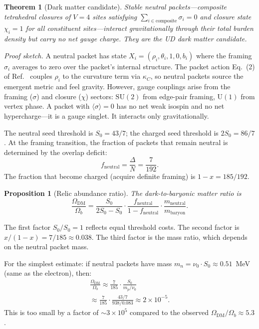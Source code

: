 \documentclass[11pt,twocolumn]{article}
\newtheorem{theorem}{Theorem}
\newtheorem{proposition}{Proposition}
\begin{document}
\begin{theorem}[Dark matter candidate]
\label{thm:dm}
Stable neutral packets---composite tetrahedral closures of $V=4$ sites satisfying $\sum_{i\in\mathrm{composite}}\sigma_i=0$ and closure state $\chi_i=1$ for all constituent sites---interact gravitationally through their total burden density but carry no net gauge charge.
They are the UD dark matter candidate.
\end{theorem}

\textit{Proof sketch.}
A neutral packet has state $X_i=(\rho_i,\theta_i,1,0,b_i)$ where the framing $\sigma_i$ averages to zero over the packet's internal structure.
The packet action Eq.~(2) of Ref.~\cite{mayes2026ud} couples $\rho_i$ to the curvature term via $\kappa_C$, so neutral packets source the emergent metric and feel gravity.
However, gauge couplings arise from the framing ($\sigma$) and closure ($\chi$) sectors: $\mathrm{SU}(2)$ from edge-pair framing, $\mathrm{U}(1)$ from vertex phase.
A packet with $\langle\sigma\rangle=0$ has no net weak isospin and no net hypercharge---it is a gauge singlet.
It interacts only gravitationally.

The neutral seed threshold is $S_0=43/7$; the charged seed threshold is $2S_0=86/7$.
At the framing transition, the fraction of packets that remain neutral is determined by the overlap deficit:
\begin{equation}
f_{\mathrm{neutral}} = \frac{\Delta}{N} = \frac{7}{192}.
\label{eq:fneutral}
\end{equation}
The fraction that become charged (acquire definite framing) is $1-x=185/192$.

\begin{proposition}[Relic abundance ratio]
The dark-to-baryonic matter ratio is
\begin{equation}
\frac{\Omega_{\mathrm{DM}}}{\Omega_b} = \frac{S_0}{2S_0-S_0}\cdot\frac{f_{\mathrm{neutral}}}{1-f_{\mathrm{neutral}}}\cdot\frac{m_{\mathrm{neutral}}}{m_{\mathrm{baryon}}}.
\label{eq:ratio}
\end{equation}
\end{proposition}

The first factor $S_0/S_0=1$ reflects equal threshold costs.
The second factor is $x/(1-x)=7/185\approx 0.038$.
The third factor is the mass ratio, which depends on the neutral packet mass.

For the simplest estimate: if neutral packets have mass $m_n=\nu_0\cdot S_0\approx 0.51$~MeV (same as the electron), then:
\begin{multline}
\frac{\Omega_{\mathrm{DM}}}{\Omega_b}\approx\frac{7}{185}\cdot\frac{S_0}{m_p/\nu_0}\\
\approx\frac{7}{185}\cdot\frac{43/7}{938/0.083}\approx 2\times 10^{-5}.
\end{multline}
This is too small by a factor of $\sim 3\times 10^5$ compared to the observed $\Omega_{\mathrm{DM}}/\Omega_b\approx 5.3$.
\end{document}
